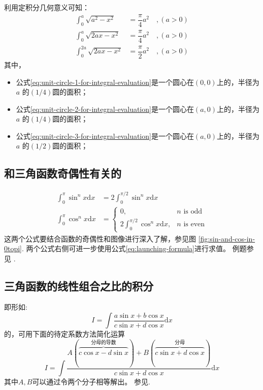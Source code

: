 利用定积分几何意义可知：
\begin{align}
    \int_0^{a}  \sqrt{a^2 - x^2} &= \dfrac{\pi}{4} a^2 \quad,(a > 0) \label{eq:unit-circle-1-for-integral-evaluation}\\
    \int_0^{a}  \sqrt{2ax - x^2} &= \dfrac{\pi}{4} a^2 \quad,(a > 0) \label{eq:unit-circle-2-for-integral-evaluation}\\
    \int_0^{2a} \sqrt{2ax - x^2} &= \dfrac{\pi}{2} a^2 \quad,(a > 0) \label{eq:unit-circle-3-for-integral-evaluation}
\end{align}
其中，
\begin{itemize}
    \item 公式\ref{eq:unit-circle-1-for-integral-evaluation}是一个圆心在$(0, 0)$上的，半径为 $a$ 的$(1/4)$圆的面积；
    \item 公式\ref{eq:unit-circle-2-for-integral-evaluation}是一个圆心在$(a, 0)$上的，半径为 $a$ 的$(1/4)$圆的面积；
    \item 公式\ref{eq:unit-circle-3-for-integral-evaluation}是一个圆心在$(a, 0)$上的，半径为 $a$ 的$(1/2)$圆的面积；
\end{itemize}

\subsection{和三角函数奇偶性有关的}

\begin{align}
    \int_0^{\pi} \sin^n x \mathrm{d}x &= 2 \int_0^{\pi/2} \sin^n x \mathrm{d}x \\
    \int_0^{\pi} \cos^n x \mathrm{d}x &= 
    \left\{
        \begin{array}{rl}
            0,                                       &n \mbox{\ is odd} \\
            2 \int_{0}^{\pi/2} \cos^n x \mathrm{d}x, &n \mbox{\ is even}
        \end{array}
    \right.
\end{align}
这两个公式要结合函数的奇偶性和图像进行深入了解，参见图 
\ref{fig:sin-and-cos-in-0topi}.
两个公式右侧可进一步使用公式\ref{eq:launching-formula}进行求值。
例题参见 \cite[page 108, pdf 119, exmaple 3]{we}.

\subsection{三角函数的线性组合之比的积分}

即形如:
\[
    I = \int \dfrac{a \sin x + b \cos x}{c \sin x + d \cos x}\mathrm{d}x
\]
的，可用下面的待定系数方法简化运算
\begin{equation}
    I = \int 
    \dfrac{
         A(\overbrace{c \cos x - d \sin x}^{\mbox{分母的导数}})
        +B(\overbrace{c \sin x + d \cos x}^{\mbox{分母}})
    }{c \sin x + d \cos x} \mathrm{d}x
\end{equation}
其中$A, B$可以通过令两个分子相等解出。
参见\cite[page 110, pdf 121, example 8]{we}.


